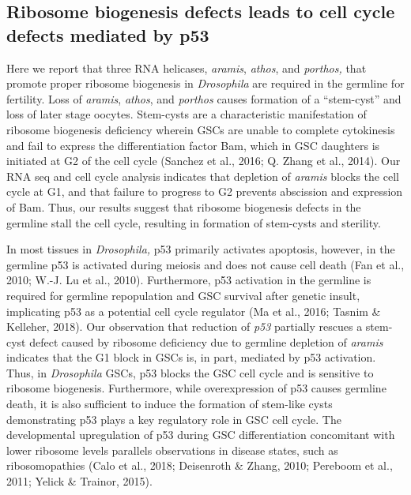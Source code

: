 \documentclass[12pt,oneside]{reedthesis}
\begin{document}
\hypertarget{ribosome-biogenesis-defects-leads-to-cell-cycle-defects-mediated-by-p53}{%
\subsection{Ribosome biogenesis defects leads to cell cycle defects mediated by p53}\label{ribosome-biogenesis-defects-leads-to-cell-cycle-defects-mediated-by-p53}}

Here we report that three RNA helicases, \emph{aramis}, \emph{athos}, and
\emph{porthos,} that promote proper ribosome biogenesis in \emph{Drosophila} are
required in the germline for fertility. Loss of \emph{aramis}, \emph{athos}, and
\emph{porthos} causes formation of a ``stem-cyst'' and loss of later stage
oocytes. Stem-cysts are a characteristic manifestation of ribosome
biogenesis deficiency wherein GSCs are unable to complete cytokinesis
and fail to express the differentiation factor Bam, which in GSC
daughters is initiated at G2 of the cell cycle (Sanchez et al., 2016; Q. Zhang et al., 2014). Our RNA seq and cell cycle analysis indicates that
depletion of \emph{aramis} blocks the cell cycle at G1, and that failure to
progress to G2 prevents abscission and expression of Bam. Thus, our
results suggest that ribosome biogenesis defects in the germline stall
the cell cycle, resulting in formation of stem-cysts and sterility.

In most tissues in \emph{Drosophila,} p53 primarily activates apoptosis,
however, in the germline p53 is activated during meiosis and does not
cause cell death (Fan et al., 2010; W.-J. Lu et al., 2010). Furthermore, p53 activation in
the germline is required for germline repopulation and GSC survival
after genetic insult, implicating p53 as a potential cell cycle
regulator (Ma et al., 2016; Tasnim \& Kelleher, 2018). Our
observation that reduction of \emph{p53} partially rescues a stem-cyst defect
caused by ribosome deficiency due to germline depletion of \emph{aramis}
indicates that the G1 block in GSCs is, in part, mediated by p53
activation. Thus, in \emph{Drosophila} GSCs, p53 blocks the GSC cell cycle
and is sensitive to ribosome biogenesis. Furthermore, while
overexpression of p53 causes germline death, it is also sufficient to
induce the formation of stem-like cysts demonstrating p53 plays a key
regulatory role in GSC cell cycle. The developmental upregulation of p53
during GSC differentiation concomitant with lower ribosome levels
parallels observations in disease states, such as ribosomopathies
(Calo et al., 2018; Deisenroth \& Zhang, 2010; Pereboom et al., 2011; Yelick \& Trainor, 2015).
\end{document}
